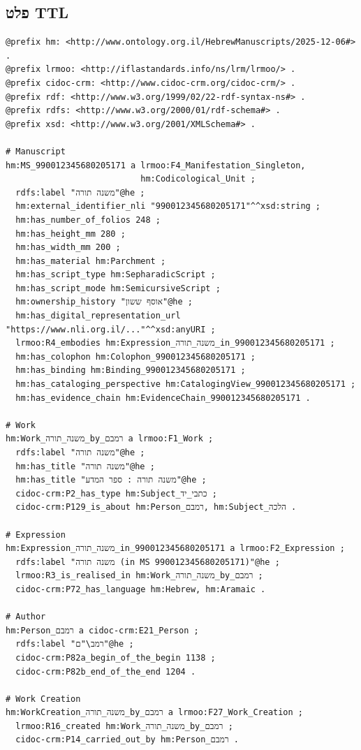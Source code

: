 \documentclass[12pt,a4paper]{article}
\begin{document}
\subsection{פלט TTL}

\begin{LTR}
\begin{verbatim}
@prefix hm: <http://www.ontology.org.il/HebrewManuscripts/2025-12-06#> .
@prefix lrmoo: <http://iflastandards.info/ns/lrm/lrmoo/> .
@prefix cidoc-crm: <http://www.cidoc-crm.org/cidoc-crm/> .
@prefix rdf: <http://www.w3.org/1999/02/22-rdf-syntax-ns#> .
@prefix rdfs: <http://www.w3.org/2000/01/rdf-schema#> .
@prefix xsd: <http://www.w3.org/2001/XMLSchema#> .

# Manuscript
hm:MS_990012345680205171 a lrmoo:F4_Manifestation_Singleton,
                           hm:Codicological_Unit ;
  rdfs:label "משנה תורה"@he ;
  hm:external_identifier_nli "990012345680205171"^^xsd:string ;
  hm:has_number_of_folios 248 ;
  hm:has_height_mm 280 ;
  hm:has_width_mm 200 ;
  hm:has_material hm:Parchment ;
  hm:has_script_type hm:SepharadicScript ;
  hm:has_script_mode hm:SemicursiveScript ;
  hm:ownership_history "אוסף ששון"@he ;
  hm:has_digital_representation_url "https://www.nli.org.il/..."^^xsd:anyURI ;
  lrmoo:R4_embodies hm:Expression_משנה_תורה_in_990012345680205171 ;
  hm:has_colophon hm:Colophon_990012345680205171 ;
  hm:has_binding hm:Binding_990012345680205171 ;
  hm:has_cataloging_perspective hm:CatalogingView_990012345680205171 ;
  hm:has_evidence_chain hm:EvidenceChain_990012345680205171 .

# Work
hm:Work_משנה_תורה_by_רמבם a lrmoo:F1_Work ;
  rdfs:label "משנה תורה"@he ;
  hm:has_title "משנה תורה"@he ;
  hm:has_title "משנה תורה : ספר המדע"@he ;
  cidoc-crm:P2_has_type hm:Subject_כתבי_יד ;
  cidoc-crm:P129_is_about hm:Person_רמבם, hm:Subject_הלכה .

# Expression
hm:Expression_משנה_תורה_in_990012345680205171 a lrmoo:F2_Expression ;
  rdfs:label "משנה תורה (in MS 990012345680205171)"@he ;
  lrmoo:R3_is_realised_in hm:Work_משנה_תורה_by_רמבם ;
  cidoc-crm:P72_has_language hm:Hebrew, hm:Aramaic .

# Author
hm:Person_רמבם a cidoc-crm:E21_Person ;
  rdfs:label "רמב\"ם"@he ;
  cidoc-crm:P82a_begin_of_the_begin 1138 ;
  cidoc-crm:P82b_end_of_the_end 1204 .

# Work Creation
hm:WorkCreation_משנה_תורה_by_רמבם a lrmoo:F27_Work_Creation ;
  lrmoo:R16_created hm:Work_משנה_תורה_by_רמבם ;
  cidoc-crm:P14_carried_out_by hm:Person_רמבם .


\end{verbatim}
\end{LTR}
\end{document}
